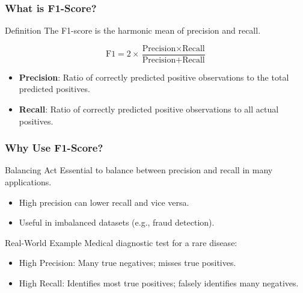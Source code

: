 \documentclass[aspectratio=169]{beamer}
\begin{document}
\begin{frame}[fragile]
    \frametitle{What is F1-Score?}

    \begin{block}{Definition}
        The F1-score is the harmonic mean of precision and recall.
    \end{block}
    
    \begin{equation}
        \text{F1} = 2 \times \frac{\text{Precision} \times \text{Recall}}{\text{Precision} + \text{Recall}}
    \end{equation}
    
    \begin{itemize}
        \item \textbf{Precision}: Ratio of correctly predicted positive observations to the total predicted positives.
        \item \textbf{Recall}: Ratio of correctly predicted positive observations to all actual positives.
    \end{itemize}
\end{frame}

\begin{frame}[fragile]
    \frametitle{Why Use F1-Score?}

    \begin{block}{Balancing Act}
        Essential to balance between precision and recall in many applications.
    \end{block}

    \begin{itemize}
        \item High precision can lower recall and vice versa.
        \item Useful in imbalanced datasets (e.g., fraud detection).
    \end{itemize}

    \begin{block}{Real-World Example}
        Medical diagnostic test for a rare disease:
        \begin{itemize}
            \item High Precision: Many true negatives; misses true positives. 
            \item High Recall: Identifies most true positives; falsely identifies many negatives.
        \end{itemize}
    \end{block}
\end{frame}
\end{document}
